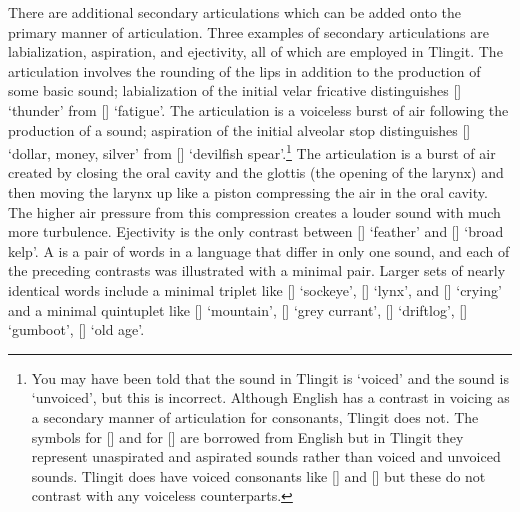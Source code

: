 There are additional secondary articulations which can be added onto the primary manner of articulation. Three examples of secondary articulations are labialization, aspiration, and ejectivity, all of which are employed in Tlingit. The  articulation involves the rounding of the lips in addition to the production of some basic sound; labialization of the initial velar fricative distinguishes  [] ‘thunder’ from  [] ‘fatigue’. The  articulation is a voiceless burst of air following the production of a sound; aspiration of the initial alveolar stop distinguishes  [] ‘dollar, money, silver’ from  [] ‘devilfish spear’.\footnote{You may have been told that the sound  in Tlingit is ‘voiced’ and the sound  is ‘unvoiced’, but this is incorrect. Although English has a contrast in voicing as a secondary manner of articulation for consonants, Tlingit does not. The symbols  for [] and  for [] are borrowed from English but in Tlingit they represent unaspirated and aspirated sounds rather than voiced and unvoiced sounds. Tlingit does have voiced consonants like  [] and  [] but these do not contrast with any voiceless counterparts.} The  articulation is a burst of air created by closing the oral cavity and the glottis (the opening of the larynx) and then moving the larynx up like a piston compressing the air in the oral cavity. The higher air pressure from this compression creates a louder sound with much more turbulence. Ejectivity is the only contrast between  [] ‘feather’ and  [] ‘broad kelp’. A  is a pair of words in a language that differ in only one sound, and each of the preceding contrasts was illustrated with a minimal pair. Larger sets of nearly identical words include a minimal triplet like  [] ‘sockeye’,  [] ‘lynx’, and  [] ‘crying’ and a minimal quintuplet like  [] ‘mountain’,  [] ‘grey currant’,  [] ‘driftlog’,  [] ‘gumboot’,  [] ‘old age’.

